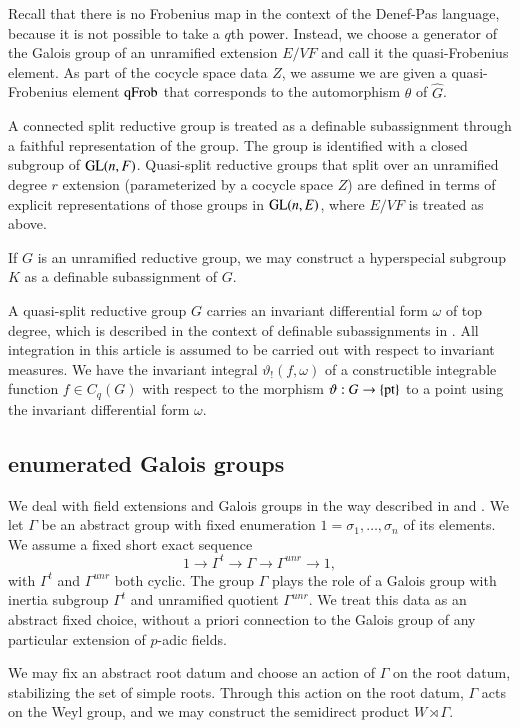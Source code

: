 Recall that there is no Frobenius map in the context of the Denef-Pas
language, because it is not possible to take a $q$th power.  Instead,
we choose a generator of the Galois group of an unramified extension
$E/VF$ and call it the quasi-Frobenius element.  As part of the
cocycle space data $Z$, we assume we are given a quasi-Frobenius
element ${\operatorname{qFrob}}$ that corresponds to the automorphism $\theta$ of
$\hat G$.

A connected split reductive group is treated as a definable
subassignment through a faithful representation of the group.  The
group is identified with a closed subgroup of ${\operatorname{GL}}(n,F)$.
Quasi-split reductive groups that split over an unramified degree $r$
extension (parameterized by a cocycle space $Z$) are defined in terms
of explicit representations of those groups in ${\operatorname{GL}}(n,E)$, where
$E/VF$ is treated as above.

If $G$ is an unramified reductive group, we may construct a
hyperspecial subgroup $K$ as a definable subassignment of $G$.

A quasi-split reductive group $G$ carries an invariant differential
form $\omega$ of top degree, which is described in the context of
definable subassignments in \cite{gordon}.  All integration in this
article is assumed to be carried out with respect to invariant
measures.  We have the invariant integral $\vartheta_!(f,\omega)$ of a
constructible integrable function $f\in C_q(G)$ with respect to the
morphism $\vartheta:G\to\{{\operatorname{pt}}\}$ to a point using the invariant
differential form $\omega$.

\subsection{enumerated Galois groups}\label{sec:galois}

We deal with field extensions and Galois groups in the way described
in \cite{gordon} and \cite{cluckers2011transfer}.  We let $\Gamma$ be
an abstract group with fixed enumeration $1=\sigma_1,\ldots,\sigma_n$
of its elements.  We assume a fixed short exact sequence
\[
1\to \Gamma^t\to\Gamma\to\Gamma^{unr}\to 1,
\]
with $\Gamma^t$ and $\Gamma^{unr}$ both cyclic.  The group $\Gamma$
plays the role of a Galois group with inertia subgroup $\Gamma^t$ and
unramified quotient $\Gamma^{unr}$.  We treat this data as an abstract
fixed choice, without a priori connection to the Galois group of any
particular extension of $p$-adic fields.

We may fix an abstract root datum and choose an action of $\Gamma$ on
the root datum, stabilizing the set of simple roots.  Through this
action on the root datum, $\Gamma$ acts on the Weyl group, and we may
construct the semidirect product $W\rtimes \Gamma$.

